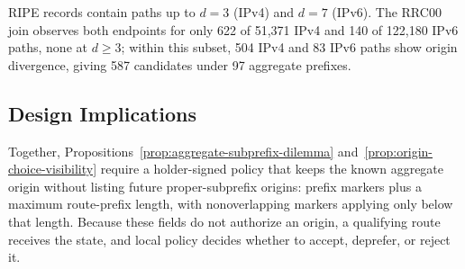 \begin{table}[t]\centering\footnotesize\setlength{\tabcolsep}{3.0pt}
\caption{RIPE allocation paths and origin divergence.}
\label{tab:visibility-candidates}
\end{table}

RIPE records contain paths up to $d=3$ (IPv4) and $d=7$ (IPv6). The RRC00 join observes both endpoints for only 622 of 51,371 IPv4 and 140 of 122,180 IPv6 paths, none at $d\geq3$; within this subset, 504 IPv4 and 83 IPv6 paths show origin divergence, giving 587 candidates under 97 aggregate prefixes.

\subsection{Design Implications}
\label{sec:requirements}

Together, Propositions~\ref{prop:aggregate-subprefix-dilemma} and~\ref{prop:origin-choice-visibility} require a holder-signed policy that keeps the known aggregate origin \explicit{} without listing future proper-subprefix origins: prefix markers plus a maximum route-prefix length, with nonoverlapping markers applying only below that length. Because these fields do not authorize an origin, a qualifying route receives the \openscope{} state, and local policy decides whether to accept, deprefer, or reject it.
